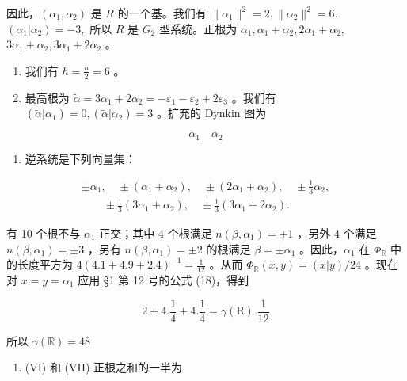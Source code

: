 因此，\((\alpha_{1},\alpha_{2})\) 是 \(R\) 的一个基。我们有 \(\| \alpha_{1}\|^{2} = 2,\| \alpha_{2}\|^{2} = 6.\) \((\alpha_{1}|\alpha_{2}) = -3,\) 所以 \(R\) 是 \(G_{2}\) 型系统。正根为 \(\alpha_{1},\alpha_{1} + \alpha_{2},2\alpha_{1} + \alpha_{2},\) \(3\alpha_{1} + \alpha_{2},3\alpha_{1} + 2\alpha_{2}\) 。

\begin{enumerate}
\def\labelenumi{(\Roman{enumi})}
\setcounter{enumi}{2}
\item
  我们有 \(h = \frac{n}{2} = 6\) 。
\item
  最高根为 \(\tilde{\alpha} = 3\alpha_{1} + 2\alpha_{2} = -\varepsilon_{1} - \varepsilon_{2} + 2\varepsilon_{3}\) 。我们有 \((\tilde{\alpha}|\alpha_{1}) = 0, (\tilde{\alpha}|\alpha_{2}) = 3\) 。扩充的 Dynkin 图为
\end{enumerate}

\[
\alpha_ {1} \quad \alpha_ {2}
\]

\begin{enumerate}
\def\labelenumi{(\Alph{enumi})}
\setcounter{enumi}{21}
\tightlist
\item
  逆系统是下列向量集：
\end{enumerate}

\[
\begin{array}{l} \pm \alpha_ {1}, \quad \pm (\alpha_ {1} + \alpha_ {2}), \quad \pm (2 \alpha_ {1} + \alpha_ {2}), \quad \pm \frac {1}{3} \alpha_ {2}, \\ \qquad \pm \frac {1}{3} (3 \alpha_ {1} + \alpha_ {2}), \quad \pm \frac {1}{3} (3 \alpha_ {1} + 2 \alpha_ {2}). \end{array}
\]

  有 10 个根不与 \(\alpha_{1}\) 正交；其中 4 个根满足 \(n(\beta, \alpha_{1}) = \pm 1\) ，另外 4 个满足 \(n(\beta, \alpha_{1}) = \pm 3\) ，另有 \(n(\beta, \alpha_{1}) = \pm 2\) 的根满足 \(\beta = \pm \alpha_{1}\) 。因此，\(\alpha_{1}\) 在 \(\Phi_{\mathbb{R}}\) 中的长度平方为 \(4(4.1 + 4.9 + 2.4)^{-1} = \frac{1}{12}\) 。从而 \(\Phi_{\mathbb{R}}(x, y) = (x|y)/24\) 。现在对 \(x = y = \alpha_{1}\) 应用 §1 第 12 号的公式 (18)，得到

\[
2 + 4. \frac {1}{4} + 4. \frac {1}{4} = \gamma (\mathrm{R}). \frac {1}{12}
\]

所以 \(\gamma (\mathbb{R}) = 48\)

\begin{enumerate}
\def\labelenumi{(\Roman{enumi})}
\setcounter{enumi}{5}
\tightlist
\item
  (VI) 和 (VII) 正根之和的一半为
\end{enumerate}

